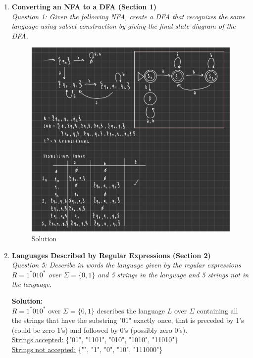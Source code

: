 \documentclass[10pt,letterpaper,unboxed,cm]{article}
\begin{document}
\begin{enumerate}

\item \textbf{Converting an NFA to a DFA (Section 1)} \\
\emph{Question 1: Given the following NFA, create a DFA that recognizes the same language using subset construction by giving the final state diagram of the DFA.}

\begin{figure}[h]
    \centering
    \includegraphics[width=1\linewidth]{images/hw3q1.png}
    \caption{Solution}
    \label{fig:placeholder}
\end{figure}

\pagebreak 

\item \textbf{Languages Described by Regular Expressions (Section 2)} \\
\emph{Question 5: Describe in words the language given by the regular expressions $R=1^*010^*$ over $\Sigma = \{0,1\}$ and 5 strings in the language and 5 strings not in the language.}

\textbf{Solution:}
\\$R=1^*010^*$ over $\Sigma=\{0,1\}$ describes the language $L$ over $\Sigma$ containing all the strings that have the substring "$01$" exactly once, that is preceded by 1's (could be zero 1's) and followed by 0's (possibly zero 0's).
\\\underline{Strings accepted:} \{"01", "1101", "010", "1010", "11010"\}
\\\underline{Strings not accepted:} \{"", "1", "0", "10", "111000"\}


\end{enumerate}
\end{document}

